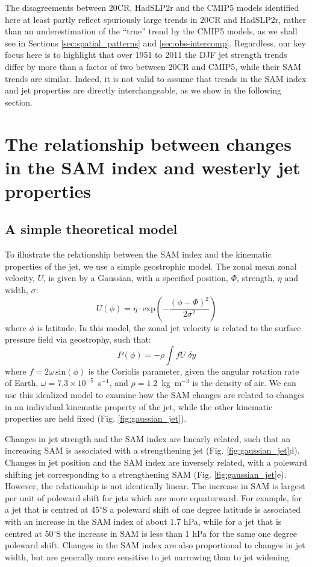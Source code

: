 \documentclass{ametsoc}
\begin{document}
The disagreements between 20CR, HadSLP2r and the CMIP5
models identified here at least partly reflect spuriously large trends in 20CR and HadSLP2r, rather than 
an underestimation of the ``true'' trend by the CMIP5 models, as we shall see in 
Sections  \ref{sec:spatial_patterns} and \ref{sec:obs-intercomp}. Regardless, our key focus 
here is to highlight that over 1951 to 2011 the DJF jet strength trends differ by more than
 a factor of two between 20CR and 
CMIP5, while their SAM trends are similar. Indeed, it is not valid to assume that trends in the 
SAM index and jet properties are directly interchangeable, as we show in the following section.

\section{The relationship between changes in the SAM index and westerly jet properties} \label{sec:sam_vs_jet}
\subsection{A simple theoretical model}
To illustrate the relationship between the SAM index and the kinematic properties of the jet,
we use a simple geostrophic model. The zonal mean zonal velocity, $U$, is 
given by a Gaussian, with a specified position, $\Phi$, strength, $\eta$ and width, $\sigma$:
\begin{equation}
U (\phi) = \eta \cdot \textrm{exp} \left( - \frac{ (\phi -\Phi)^2}{2 \sigma^2} \right )
\end{equation}
where $\phi$ is latitude. In this model, the zonal jet velocity is related to the surface pressure field 
via geostrophy, such that:
\begin{equation}
P(\phi) = - \rho \int f U  \;\delta y
\end{equation}
where $f=2\omega \,\textrm{sin} ( \phi)$ is the Coriolis parameter, given the angular rotation
rate of Earth, $\omega=7.3 \times10^{−5}$~s$^{-1}$, and $\rho=1.2$~kg~m$^{-3}$ is the 
density of air. We can use this idealized model to examine how the SAM changes are related 
to changes in an individual kinematic property of the jet, while the other kinematic 
properties are held fixed (Fig. \ref{fig:gaussian_jet}).

Changes in jet strength and the SAM index are linearly related, such that an increasing SAM is
associated with a strengthening jet (Fig. \ref{fig:gaussian_jet}d). Changes in jet position and 
the SAM index are inversely related, with a poleward shifting jet corresponding 
to a strengthening SAM (Fig. \ref{fig:gaussian_jet}e).  However, the relationship
is not identically linear. The increase in SAM is largest per unit of poleward shift for jets 
which are more equatorward. For example, for a jet that is centred at 45$^{\circ}$S a poleward shift of one 
degree latitude is associated with an increase in the SAM index of about 1.7 hPa, while 
for a jet that is centred at 50$^{\circ}$S the increase in SAM is less than 1 hPa for 
the same one degree poleward shift. Changes in the SAM index are also proportional to changes 
in jet width, but are generally more sensitive to jet narrowing than to jet widening.
\end{document}
